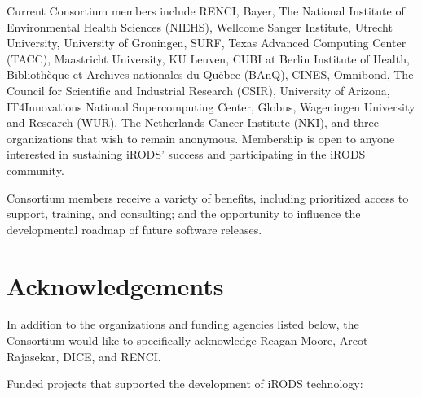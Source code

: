 \documentclass[10pt,oneside]{memoir}
\begin{document}
Current Consortium members include RENCI, Bayer, The National Institute of Environmental Health Sciences (NIEHS), Wellcome Sanger Institute, Utrecht University, University of Groningen, SURF, Texas Advanced Computing Center (TACC), Maastricht University, KU Leuven, CUBI at Berlin Institute of Health, Bibliothèque et Archives nationales du Québec (BAnQ), CINES, Omnibond, The Council for Scientific and Industrial Research (CSIR), University of Arizona, IT4Innovations National Supercomputing Center, Globus, Wageningen University and Research (WUR), The Netherlands Cancer Institute (NKI), and three organizations that wish to remain anonymous. Membership is open to anyone interested in sustaining iRODS' success and participating in the iRODS community.

Consortium members receive a variety of benefits, including prioritized access to support, training, and consulting; and the opportunity to influence the developmental roadmap of future software releases.


\newpage
\section{Acknowledgements}

In addition to the organizations and funding agencies listed below, the Consortium would like to specifically acknowledge Reagan Moore, Arcot Rajasekar, DICE, and RENCI.

Funded projects that supported the development of iRODS technology:
\end{document}
